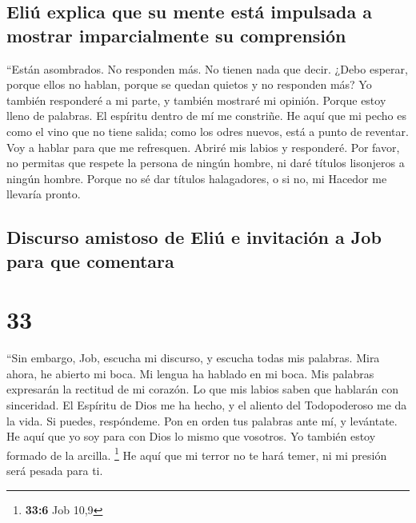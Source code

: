 \hypertarget{eliuxfa-explica-que-su-mente-estuxe1-impulsada-a-mostrar-imparcialmente-su-comprensiuxf3n}{%
\subsection{Eliú explica que su mente está impulsada a mostrar
imparcialmente su
comprensión}\label{eliuxfa-explica-que-su-mente-estuxe1-impulsada-a-mostrar-imparcialmente-su-comprensiuxf3n}}

 ``Están asombrados. No responden más. No tienen nada que
decir.  ¿Debo esperar, porque ellos no hablan, porque se
quedan quietos y no responden más?  Yo también responderé
a mi parte, y también mostraré mi opinión.  Porque estoy
lleno de palabras. El espíritu dentro de mí me constriñe.
 He aquí que mi pecho es como el vino que no tiene
salida; como los odres nuevos, está a punto de reventar. 
Voy a hablar para que me refresquen. Abriré mis labios y responderé.
 Por favor, no permitas que respete la persona de ningún
hombre, ni daré títulos lisonjeros a ningún hombre. 
Porque no sé dar títulos halagadores, o si no, mi Hacedor me llevaría
pronto.

\hypertarget{discurso-amistoso-de-eliuxfa-e-invitaciuxf3n-a-job-para-que-comentara}{%
\subsection{Discurso amistoso de Eliú e invitación a Job para que
comentara}\label{discurso-amistoso-de-eliuxfa-e-invitaciuxf3n-a-job-para-que-comentara}}

\hypertarget{section-32}{%
\section{33}\label{section-32}}

 ``Sin embargo, Job, escucha mi discurso, y escucha todas
mis palabras.  Mira ahora, he abierto mi boca. Mi lengua
ha hablado en mi boca.  Mis palabras expresarán la
rectitud de mi corazón. Lo que mis labios saben que hablarán con
sinceridad.  El Espíritu de Dios me ha hecho, y el aliento
del Todopoderoso me da la vida.  Si puedes, respóndeme.
Pon en orden tus palabras ante mí, y levántate.  He aquí
que yo soy para con Dios lo mismo que vosotros. Yo también estoy formado
de la arcilla. \footnote{\textbf{33:6} Job 10,9}  He aquí
que mi terror no te hará temer, ni mi presión será pesada para ti.

